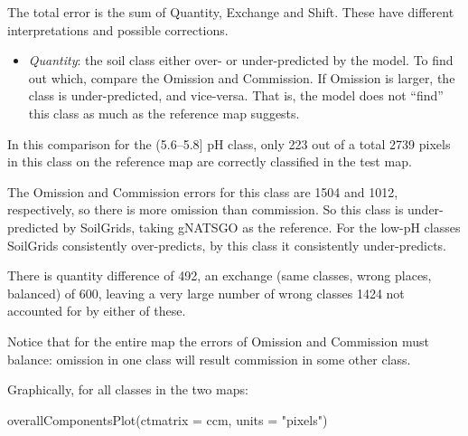\documentclass[
  letterpaper,
  DIV=11,
  numbers=noendperiod]{scrartcl}
\newenvironment{Shaded}{\begin{snugshade}}{\end{snugshade}}
\newcommand{\AttributeTok}[1]{\textcolor[rgb]{0.40,0.45,0.13}{#1}}
\newcommand{\FunctionTok}[1]{\textcolor[rgb]{0.28,0.35,0.67}{#1}}
\newcommand{\NormalTok}[1]{\textcolor[rgb]{0.00,0.23,0.31}{#1}}
\newcommand{\StringTok}[1]{\textcolor[rgb]{0.13,0.47,0.30}{#1}}
\providecommand{\tightlist}{%
  \setlength{\itemsep}{0pt}\setlength{\parskip}{0pt}}\usepackage{longtable,booktabs,array}
\begin{document}
The total error is the sum of Quantity, Exchange and Shift. These have
different interpretations and possible corrections.

\begin{itemize}
\tightlist
\item
  \emph{Quantity}: the soil class either over- or under-predicted by the
  model. To find out which, compare the Omission and Commission. If
  Omission is larger, the class is under-predicted, and vice-versa. That
  is, the model does not ``find'' this class as much as the reference
  map suggests.
\end{itemize}

In this comparison for the (5.6--5.8{]} pH class, only 223 out of a
total 2739 pixels in this class on the reference map are correctly
classified in the test map.

The Omission and Commission errors for this class are 1504 and 1012,
respectively, so there is more omission than commission. So this class
is under-predicted by SoilGrids, taking gNATSGO as the reference. For
the low-pH classes SoilGrids consistently over-predicts, by this class
it consistently under-predicts.

There is quantity difference of 492, an exchange (same classes, wrong
places, balanced) of 600, leaving a very large number of wrong classes
1424 not accounted for by either of these.

Notice that for the entire map the errors of Omission and Commission
must balance: omission in one class will result commission in some other
class.

Graphically, for all classes in the two maps:

\begin{Shaded}
\begin{Highlighting}[]
\FunctionTok{overallComponentsPlot}\NormalTok{(}\AttributeTok{ctmatrix =}\NormalTok{ ccm, }\AttributeTok{units =} \StringTok{"pixels"}\NormalTok{)}
\end{Highlighting}
\end{Shaded}
\end{document}
